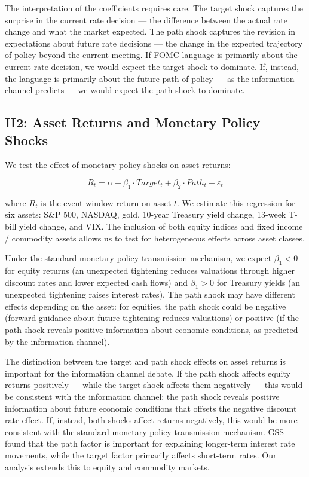 \documentclass[12pt]{article}
\begin{document}
The interpretation of the coefficients requires care. The target shock captures the surprise in the current rate decision --- the difference between the actual rate change and what the market expected. The path shock captures the revision in expectations about future rate decisions --- the change in the expected trajectory of policy beyond the current meeting. If FOMC language is primarily about the current rate decision, we would expect the target shock to dominate. If, instead, the language is primarily about the future path of policy --- as the information channel predicts --- we would expect the path shock to dominate.

\subsection{H2: Asset Returns and Monetary Policy Shocks}

We test the effect of monetary policy shocks on asset returns:

\begin{equation*}
R_t = \alpha + \beta_1 \cdot Target_t + \beta_2 \cdot Path_t + \varepsilon_t
\end{equation*}

where $R_t$ is the event-window return on asset $t$. We estimate this regression for six assets: S\&P 500, NASDAQ, gold, 10-year Treasury yield change, 13-week T-bill yield change, and VIX. The inclusion of both equity indices and fixed income / commodity assets allows us to test for heterogeneous effects across asset classes.

Under the standard monetary policy transmission mechanism, we expect $\beta_1 < 0$ for equity returns (an unexpected tightening reduces valuations through higher discount rates and lower expected cash flows) and $\beta_1 > 0$ for Treasury yields (an unexpected tightening raises interest rates). The path shock may have different effects depending on the asset: for equities, the path shock could be negative (forward guidance about future tightening reduces valuations) or positive (if the path shock reveals positive information about economic conditions, as predicted by the information channel).

The distinction between the target and path shock effects on asset returns is important for the information channel debate. If the path shock affects equity returns positively --- while the target shock affects them negatively --- this would be consistent with the information channel: the path shock reveals positive information about future economic conditions that offsets the negative discount rate effect. If, instead, both shocks affect returns negatively, this would be more consistent with the standard monetary policy transmission mechanism. GSS found that the path factor is important for explaining longer-term interest rate movements, while the target factor primarily affects short-term rates. Our analysis extends this to equity and commodity markets.
\end{document}

